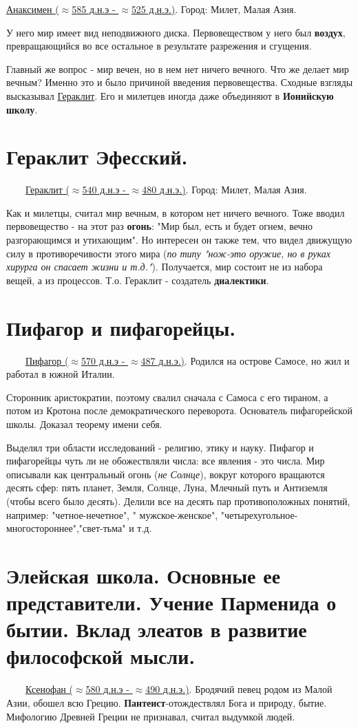 \documentclass[12pt,a4paper]{article}
\begin{document}
\underline{Анаксимен ($\approx$585 д.н.э - $\approx$525 д.н.э.)}. Город: Милет, Малая Азия.

У него мир имеет вид неподвижного диска. 
Первовеществом у него был \textbf{воздух}, превращающийся во все остальное в результате разрежения и сгущения.

Главный же вопрос - мир вечен, но в нем нет ничего вечного. Что же делает мир вечным? Именно это и было причиной введения первовещества. Сходные взгляды высказывал \underline{Гераклит}. Его и милетцев иногда даже объединяют в \textbf{Ионийскую школу}.

\section{Гераклит Эфесский.}
\ \ \ \
\underline{Гераклит ($\approx$540 д.н.э - $\approx$480 д.н.э.)}. Город: Милет, Малая Азия.

Как и милетцы, считал мир вечным, в котором нет ничего вечного. Тоже вводил первовещество - на этот раз \textbf{огонь}: "Мир был, есть и будет огнем, вечно разгорающимся и утихающим". Но интересен он также тем, что видел движущую силу в противоречивости этого мира (\textit{по типу "нож-это оружие, но в руках хирурга он спасает жизни и т.д."}). Получается, мир состоит не из набора вещей, а из процессов. Т.о. Гераклит - создатель \textbf{диалектики}. 

\section{Пифагор и пифагорейцы.}
\ \ \ \
\underline{Пифагор ($\approx$570 д.н.э - $\approx$487 д.н.э.)}. Родился на острове Самосе, но жил и работал в южной Италии.

Сторонник аристократии, поэтому свалил сначала с Самоса с его тираном, а потом из Кротона после демократического переворота.
Основатель пифагорейской школы. Доказал теорему имени себя.

Выделял три области исследований - религию, этику и науку. Пифагор и пифагорейцы чуть ли не обожествляли числа: все явления - это числа. Мир описывали как центральный огонь (\textit{не Солнце}), вокруг которого вращаются десять сфер: пять планет, Земля, Солнце, Луна, Млечный путь и Антиземля (чтобы всего было десять). Делили все на десять пар противоположных понятий, например: "четное-нечетное", " мужское-женское", "четырехугольное-многостороннее","свет-тьма" и т.д.

\section{Элейская школа. Основные ее представители. Учение Парменида о бытии. Вклад элеатов в развитие философской мысли.}
\ \ \ \
\underline{Ксенофан ($\approx$580 д.н.э - $\approx$490 д.н.э.)}. Бродячий певец родом из Малой Азии, обошел всю Грецию. \textbf{Пантеист}-отождествлял Бога и природу, бытие. Мифологию Древней Греции не признавал, считал выдумкой людей.
\end{document}
